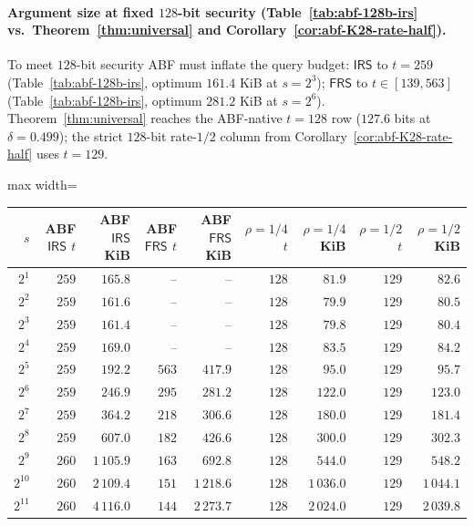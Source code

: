 \documentclass[11pt]{article}
\theoremstyle{definition}
\theoremstyle{remark}
\begin{document}
\paragraph{Argument size at fixed $128$-bit security
(Table~\ref{tab:abf-128b-irs} vs.\ Theorem~\ref{thm:universal} and
Corollary~\ref{cor:abf-K28-rate-half}).}
To meet $128$-bit security ABF must inflate the query budget: $\mathsf{IRS}$
to $t = 259$ (Table~\ref{tab:abf-128b-irs}, optimum $161.4$ KiB at
$s = 2^{3}$); $\mathsf{FRS}$ to $t \in [139, 563]$
(Table~\ref{tab:abf-128b-irs}, optimum $281.2$ KiB at $s = 2^{6}$).
Theorem~\ref{thm:universal} reaches the ABF-native $t=128$ row
($127.6$ bits at $\delta=0.499$); the strict $128$-bit rate-$1/2$
column from Corollary~\ref{cor:abf-K28-rate-half} uses $t=129$.

\begin{table}[h]
\centering
\small
\begin{adjustbox}{max width=\textwidth}
\begin{tabular}{rrrrrrrrr}
\toprule
$s$ & ABF $\mathsf{IRS}$ $t$ & ABF $\mathsf{IRS}$ KiB & ABF $\mathsf{FRS}$ $t$ & ABF $\mathsf{FRS}$ KiB & $\rho{=}1/4$ $t$ & $\rho{=}1/4$ KiB & $\rho{=}1/2$ $t$ & $\rho{=}1/2$ KiB \\
\midrule
$2^1$ & $259$ & $165.8$ & -- & -- & $128$ & $81.9$ & $129$ & $82.6$ \\
$2^2$ & $259$ & $161.6$ & -- & -- & $128$ & $79.9$ & $129$ & $80.5$ \\
$2^3$ & $259$ & $\mathbf{161.4}$ & -- & -- & $128$ & $\mathbf{79.8}$ & $129$ & $\mathbf{80.4}$ \\
$2^4$ & $259$ & $169.0$ & -- & -- & $128$ & $83.5$ & $129$ & $84.2$ \\
$2^5$ & $259$ & $192.2$ & $563$ & $417.9$ & $128$ & $95.0$ & $129$ & $95.7$ \\
$2^6$ & $259$ & $246.9$ & $295$ & $\mathbf{281.2}$ & $128$ & $122.0$ & $129$ & $123.0$ \\
$2^7$ & $259$ & $364.2$ & $218$ & $306.6$ & $128$ & $180.0$ & $129$ & $181.4$ \\
$2^8$ & $259$ & $607.0$ & $182$ & $426.6$ & $128$ & $300.0$ & $129$ & $302.3$ \\
$2^9$ & $260$ & $1\,105.9$ & $163$ & $692.8$ & $128$ & $544.0$ & $129$ & $548.2$ \\
$2^{10}$ & $260$ & $2\,109.4$ & $151$ & $1\,218.6$ & $128$ & $1\,036.0$ & $129$ & $1\,044.1$ \\
$2^{11}$ & $260$ & $4\,116.0$ & $144$ & $2\,273.7$ & $128$ & $2\,024.0$ & $129$ & $2\,039.8$ \\

\end{tabular}
\end{adjustbox}
\end{table}
\end{document}
